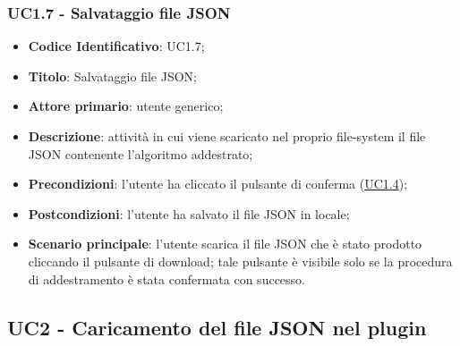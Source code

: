 	\subsubsection{UC1.7 - Salvataggio file JSON}
		\begin{itemize}
			\item\textbf{Codice Identificativo}: UC1.7;
			\item\textbf{Titolo}: Salvataggio file JSON;
			\item\textbf{Attore primario}: utente generico;
			\item\textbf{Descrizione}: attività in cui viene scaricato nel proprio file-system il file JSON contenente l'algoritmo addestrato;
			\item\textbf{Precondizioni}: l'utente ha cliccato il pulsante di conferma (\hyperref[par:UC1.4]{UC1.4});
			\item\textbf{Postcondizioni}: l'utente ha salvato il file JSON in locale;
			\item\textbf{Scenario principale}: l'utente scarica il file JSON che è stato prodotto cliccando il pulsante di download; tale pulsante è visibile solo se la procedura di addestramento è stata confermata con successo. 	
			
			 	
		\end{itemize}


	\label{par:UC2}
	\subsection{UC2 - Caricamento del file JSON nel plugin}
	
		

